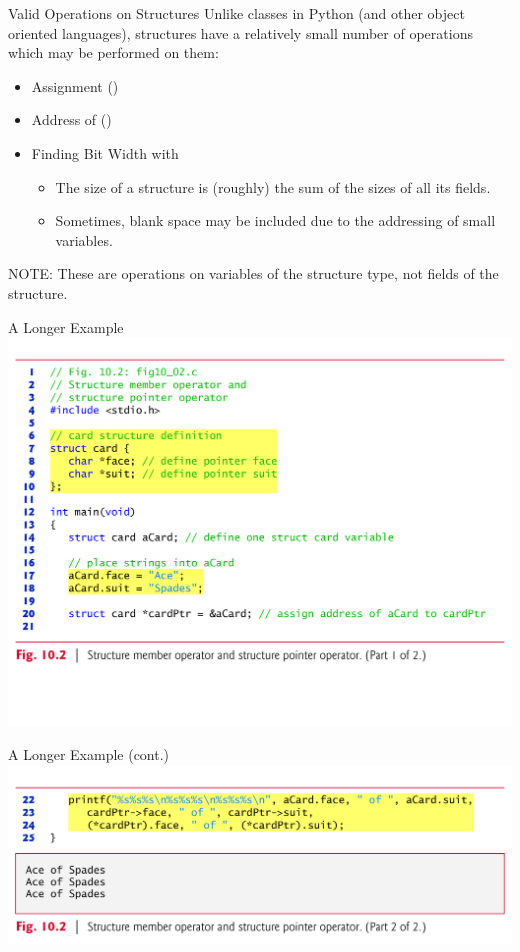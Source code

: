 \documentclass[11pt]{beamer}
\let\OldTexttt\texttt
\renewcommand{\texttt}[1]{\OldTexttt{\color{teal}{#1}}}
\begin{document}
\begin{frame}{Valid Operations on Structures}
Unlike classes in Python (and other object oriented languages), structures have a relatively small number of operations which may be performed on them:
\begin{itemize}
\item Assignment (\texttt{=})
\item Address of (\texttt{\&})
\item Finding Bit Width with \texttt{sizeof()}
\begin{itemize}
\item The size of a structure is (roughly) the sum of the sizes of all its fields.  
\item Sometimes, blank space may be included due to the addressing of small variables.
\end{itemize}
\end{itemize}
NOTE: These are operations on variables of the structure type, not fields of the structure.
\end{frame}

\begin{frame}{A Longer Example}
\center
\includegraphics[scale=0.35]{struct1.png}
\end{frame}

\begin{frame}{A Longer Example (cont.)}
\center
\includegraphics[scale=0.12]{struct2.png}
\end{frame}
\end{document}

